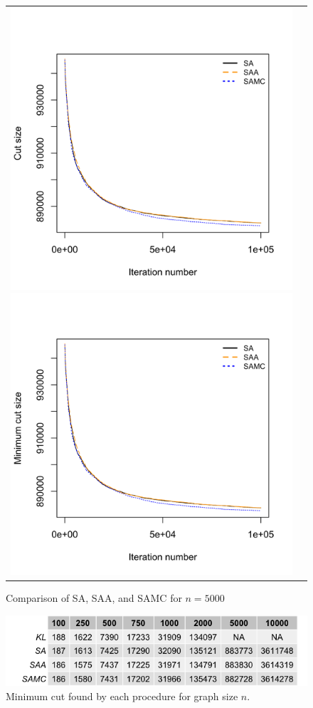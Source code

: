 \documentclass[11pt,]{article}
\begin{document}
\begin{figure}[hbpt]
  \begin{tabular}{cc}
    \includegraphics[width=.5\textwidth]{images/graph_cut_n5000_iter1e+05}
    \includegraphics[width=.5\textwidth]{images/graph_min_cut_n5000_iter1e+05}
  \end{tabular}
  \caption{Comparison of SA, SAA, and SAMC for $n = 5000$}
  \label{fig:n5000}
\end{figure}

\begin{figure}[hbpt]
  \centering
  \includegraphics[width=.9\textwidth]{images/graph_all_vals_iter1e+05}
  \caption{Minimum cut found by each procedure for graph size $n$.}
  \label{fig:allvals}
\end{figure}
\end{document}
